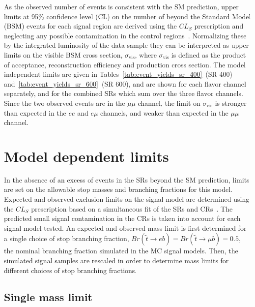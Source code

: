 As the observed number of events is consistent with the SM
prediction, upper limits at 95\% confidence level (CL) on the number of
beyond the Standard Model (BSM) events for each signal region are derived
using the $CL_S$ prescription and neglecting any possible contamination in the
control regions~\cite{Baak:2014wma}.
Normalizing these by the integrated luminosity of the data sample they can be
interpreted as upper limits on the visible BSM cross section,
$\sigma_\mathrm{vis}$, where $\sigma_\mathrm{vis}$ is defined as the product of
acceptance, reconstruction efficiency and production cross section.
The model independent limits are given in
Tables~\ref{tab:event_yields_sr_400}~(SR 400)
and~\ref{tab:event_yields_sr_600}~(SR 600), and are shown for each flavor
channel separately, and for the combined SRs which sum over the three flavor
channels.
Since the two observed events are in the $\mu\mu$ channel, the limit on
$\sigma_\mathrm{vis}$ is stronger than expected in the $ee$ and $e\mu$
channels, and weaker than expected in the $\mu\mu$ channel.

\section{Model dependent limits}
\label{sec:model_dependent_limits}

In the absence of an excess of events in the SRs beyond the SM prediction,
limits are set on the allowable stop masses and branching fractions for this
model.
Expected and observed exclusion limits on the signal model are determined using
the $CL_S$ prescription based on a simultaneous fit of the SRs and
CRs~\cite{Baak:2014wma}.
The predicted small signal contamination in the CRs is taken into account for
each signal model tested.
An expected and observed mass limit is first determined for a single choice of
stop branching fraction, $Br(\tilde{t} \to eb) = Br(\tilde{t} \to \mu b) = 0.5$,
the nominal branching fraction simulated in the MC signal models.
Then, the simulated signal samples are rescaled in order to determine mass
limits for different choices of stop branching fractions.

\subsection{Single mass limit}
\label{sec:single_mass_limit}

